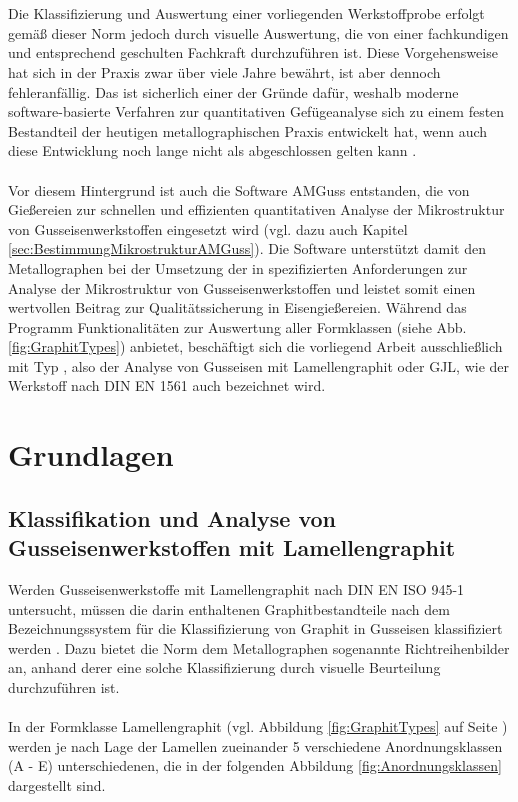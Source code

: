 \documentclass[
fontsize=10pt, 
listof = totoc,
parskip = half	
]{report}
\newcommand{\uproman}[1]{\uppercase\expandafter{\romannumeral#1}}
\begin{document}
\\\\
Die Klassifizierung und Auswertung einer vorliegenden Werkstoffprobe erfolgt gemäß dieser Norm jedoch durch visuelle Auswertung, die von einer fachkundigen und entsprechend geschulten Fachkraft durchzuführen ist. Diese Vorgehensweise hat sich in der Praxis zwar über viele Jahre bewährt, ist aber dennoch fehleranfällig. Das ist sicherlich einer der Gründe dafür, weshalb moderne software-basierte Verfahren zur quantitativen Gefügeanalyse sich zu einem festen Bestandteil der heutigen metallographischen Praxis entwickelt hat, wenn auch diese Entwicklung noch lange nicht als abgeschlossen gelten kann \cite{schumann_oettel_2016}.
\\\\
Vor diesem Hintergrund ist auch die Software AMGuss entstanden, die von Gießereien zur schnellen und effizienten quantitativen Analyse der Mikrostruktur von Gusseisenwerkstoffen eingesetzt wird (vgl. dazu auch Kapitel \ref{sec:BestimmungMikrostrukturAMGuss}). Die Software  unterstützt  damit den Metallographen bei der Umsetzung der in \cite{ISO945} spezifizierten Anforderungen zur Analyse der Mikrostruktur von Gusseisenwerkstoffen und leistet somit einen wertvollen Beitrag zur Qualitätssicherung in Eisengießereien. Während das Programm Funktionalitäten zur Auswertung aller Formklassen (siehe Abb. \ref{fig:GraphitTypes}) anbietet, beschäftigt sich die vorliegend Arbeit ausschließlich mit Typ \uproman{1}, also der Analyse von Gusseisen mit Lamellengraphit oder GJL, wie der Werkstoff nach DIN EN 1561 auch bezeichnet wird. 




\chapter{Grundlagen}
\label{ch:Grundlagen}

\section{Klassifikation und Analyse von Gusseisenwerkstoffen mit Lamellengraphit}
\label{subsec:MethodenBestAnordnungsklassen}
Werden Gusseisenwerkstoffe mit Lamellengraphit nach DIN EN ISO 945-1 untersucht, müssen die darin enthaltenen Graphitbestandteile nach dem Bezeichnungssystem für die Klassifizierung von Graphit in Gusseisen klassifiziert  werden \cite[Seite 6]{ISO945}. Dazu bietet die Norm dem Metallographen sogenannte Richtreihenbilder an, anhand derer eine solche Klassifizierung durch visuelle Beurteilung durchzuführen ist.
\\\\
In der Formklasse Lamellengraphit (vgl. Abbildung \ref{fig:GraphitTypes} auf Seite \pageref{fig:GraphitTypes}) werden je nach Lage der Lamellen zueinander 5 verschiedene Anordnungsklassen (A - E) unterschiedenen, die in der folgenden Abbildung \ref{fig:Anordnungsklassen} dargestellt sind.
\end{document}
